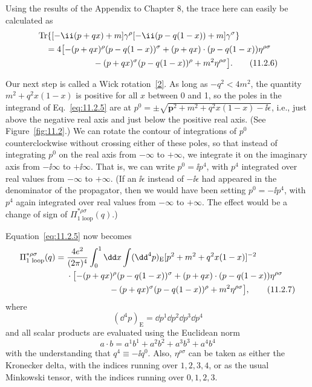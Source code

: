 Using the results of the Appendix to Chapter 8, the trace here can easily
be calculated as
\begin{align}
  &\operatorname{Tr}\{[-\ii(\sl{p}+\sl{q}x)+m]\gamma^\rho
  [-\ii(\sl{p}-\sl{q}(1-x))+m]\gamma^\sigma\}\notag\\
  &\quad=4\bigl[-(p+qx)^\rho(p-q(1-x))^\sigma
  +(p+qx)\cdot(p-q(1-x))\eta^{\rho\sigma}\notag\\
  &\hspace{6.6em}-(p+qx)^\sigma(p-q(1-x))^\rho+m^2\eta^{\rho\sigma}\bigr].
  \tag{11.2.6}\label{eq:11.2.6}
\end{align}

Our next step is called a Wick rotation~\hyperref[ref:11.2]{[2]}. As long as $-q^2<4m^2$, the
quantity $m^2+q^2x(1-x)$ is positive for all $x$ between 0 and 1, so the
poles in the integrand of Eq.~\eqref{eq:11.2.5} are at
$p^0=\pm\sqrt{\mathbf p^2+m^2+q^2x(1-x)-\ii\epsilon}$, i.e., just above the
negative real axis and just below the positive real axis. (See Figure~\ref{fig:11.2}.)
We can rotate the contour of integrations of $p^0$ counterclockwise without
crossing either of these poles, so that instead of integrating $p^0$ on the
real axis from $-\infty$ to $+\infty$, we integrate it on the imaginary axis
from $-\ii\infty$ to $+\ii\infty$. That is, we can write $p^0=\ii p^4$, with $p^4$
integrated over real values from $-\infty$ to $+\infty$. (If an $\ii\epsilon$
instead of $-\ii\epsilon$ had appeared in the denominator of the propagator,
then we would have been setting $p^0=-\ii p^4$, with $p^4$ again integrated
over real values from $-\infty$ to $+\infty$. The effect would be a change
of sign of $\Pi_{\text{1 loop}}^{*\rho\sigma}(q)$.)

\clearpage


Equation~\eqref{eq:11.2.5} now becomes
\begin{align}
  \Pi_{\text{1 loop}}^{*\rho\sigma}(q)
  ={}&\frac{4e^2}{(2\pi)^4}\int_0^1\dd x\int(\dd^4p)_{\mathrm E}
  [p^2+m^2+q^2x(1-x)]^{-2}\notag\\
  &\cdot\bigl[-(p+qx)^\rho(p-q(1-x))^\sigma
  +(p+qx)\cdot(p-q(1-x))\eta^{\rho\sigma}\notag\\
  &\hspace{5em}-(p+qx)^\sigma(p-q(1-x))^\rho+m^2\eta^{\rho\sigma}\bigr],
  \tag{11.2.7}\label{eq:11.2.7}
\end{align}
where
\[
  (\dd^4p)_{\mathrm E}=\dd p^1\dd p^2\dd p^3\dd p^4
\]
and all scalar products are evaluated using the Euclidean norm
\[
  a\cdot b=a^1b^1+a^2b^2+a^3b^3+a^4b^4
\]
with the understanding that $q^4\equiv-\ii q^0$. Also, $\eta^{\rho\sigma}$ can
be taken as either the Kronecker delta, with the indices running over
$1,2,3,4$, or as the usual Minkowski tensor, with the indices running over
$0,1,2,3$.

